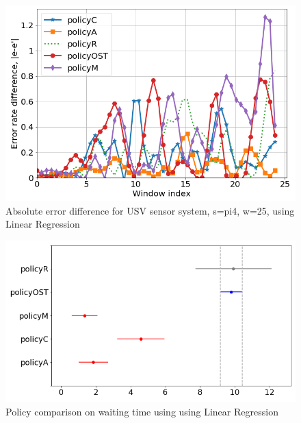 \documentclass{mpaper}
\begin{document}
\begin{figure}[h]
    \centering
    \includegraphics[scale=0.33]{imgs/lin_reg_pi4_w25.png}
    \caption{Absolute error difference for USV sensor system, s=pi4, w=25, using Linear Regression}
    \label{fig:err_lin_reg_pi4}
\end{figure}
\begin{figure}[h]
    \centering
    \includegraphics[scale=0.35]{imgs/lin_reg_pi3_waiting_plot_diff_means.png}
    \caption{Policy comparison on waiting time using using Linear Regression}
    \label{fig:svr_rbf_R5_waiting_plot_diff_means}
\end{figure}
\end{document}
